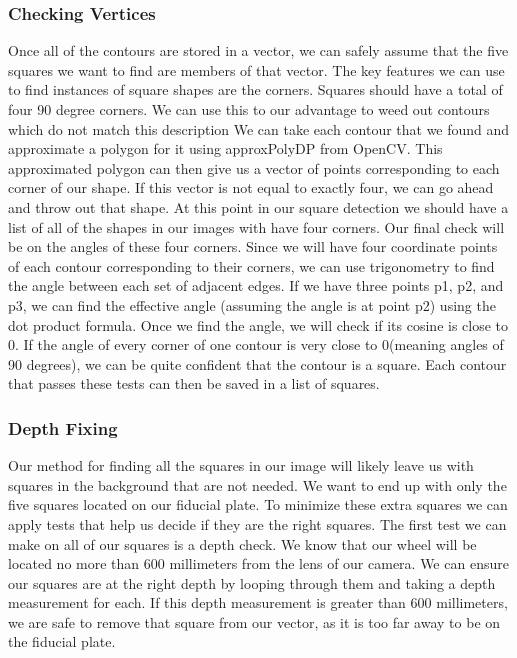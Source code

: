 \documentclass[onecolumn, draftclsnofoot,10pt, compsoc]{IEEEtran}
\begin{document}
\subsubsection{Checking Vertices}
Once all of the contours are stored in a vector, we can safely assume that the five squares we want to find are members of that vector.  The key features we can use to find instances of square shapes are the corners.  Squares should have a total of four 90 degree corners. We can use this to our advantage to weed out contours which do not match this description
\newline
\newline
 We can take each contour that we found and approximate a polygon for it using approxPolyDP from OpenCV.  This approximated polygon can then give us a vector of points corresponding to each corner of our shape.  If this vector is not equal to exactly four, we can go ahead and throw out that shape.
\newline
\newline
At this point in our square detection we should have a list of all of the shapes in our images with have four corners.  Our final check will be on the angles of these four corners.  Since we will have four coordinate points of each contour corresponding to their corners, we can use trigonometry to find the angle between each set of adjacent edges.  If we have three points p1, p2, and p3, we can find the effective angle (assuming the angle is at point p2) using the dot product  formula.  Once we find the angle, we will check if its cosine is close to 0.  If the angle of every corner of one contour is very close to 0(meaning angles of 90 degrees), we can be quite confident that the contour is a square.  Each contour that passes these tests can then be saved in a list of squares.
\subsubsection{Depth Fixing}
Our method for finding all the squares in our image will likely leave us with squares in the background that are not needed.  We want to end up with only the five squares located on our fiducial plate.  To minimize these extra squares we can apply tests that help us decide if they are the right squares. The first test we can make on all of our squares is a depth check.  We know that our wheel will be located no more than 600 millimeters from the lens of our camera. We can ensure our squares are at the right depth by looping through them and taking a depth measurement for each.  If this depth measurement is greater than 600 millimeters, we are safe to remove that square from our vector, as it is too far away to be on the fiducial plate.
\end{document}
